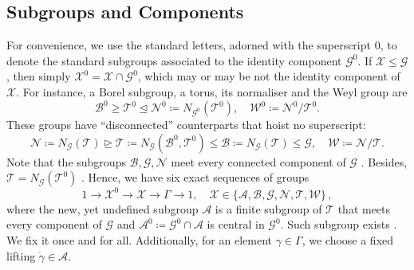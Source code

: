 \documentclass[10pt]{article}
\theoremstyle{definition}
\theoremstyle{remark}
\newcommand{\cA}{{{\mathcal A}}}
\newcommand{\cB}{{{\mathcal B}}}
\newcommand{\cG}{{{\mathcal G}}}
\newcommand{\cN}{{{\mathcal N}}}
\newcommand{\cT}{{{\mathcal T}}}
\newcommand{\cW}{{{\mathcal W}}}
\newcommand{\cX}{{{\mathcal X}}}
\newcommand{\sslash}{\mathbin{/\mkern-6mu/}}
\newcommand{\GG}{{\cG\!\sslash\! \cG}}
\begin{document}
%

\subsection{Subgroups and Components}
For convenience, we use the standard letters, adorned with the superscript $0$,
to denote the standard subgroups associated to the identity component $\cG^0$.
If $\cX\leq \cG$, then simply $\cX^0= \cX \cap \cG^0$,
which may or may be not the identity component of $\cX$.
For instance, a Borel subgroup, a torus, its normaliser and the Weyl group are
\[
\cB^0 \geq \cT^0 \unlhd  \cN^0 \coloneqq N_{\cG^0}(\cT^0), \quad \cW^0 \coloneqq \cN^0/\cT^0.
\]
These groups have ``disconnected'' counterparts that hoist no superscript:
\[
\cN \coloneqq N_{\cG}(\cT) \unrhd \cT \coloneqq N_{\cG}(\cB^0,\cT^0) \leq \cB \coloneqq N_{\cG}(\cT) \leq \cG, \quad \cW \coloneqq \cN/\cT.
\]
Note that the subgroups $\cB,\cG,\cN$ meet every connected component of $\cG$ \cite{JMR}. Besides, $\cT = N_{\cG}(\cT^0)$ \cite{JMR}.
Hence, we have six exact sequences of groups
\[
1 \rightarrow \cX^0 \rightarrow \cX \rightarrow \Gamma \rightarrow 1, \quad \cX\in \{\cA,\cB,\cG,\cN,\cT,\cW\} \, ,
\]
where %
the new, yet undefined subgroup $\cA$ is a finite subgroup of $\cT$ that meets every component of $\cG$
and $\cA^0 \coloneqq \cG^0 \cap \cA$ is central in $\cG^0$.
Such subgroup exists \cite{JMR}. We fix it once and for all.
Additionally, for an element $\gamma\in \Gamma$, we choose a fixed lifting $\dot{\gamma}\in \cA$.
\end{document}
